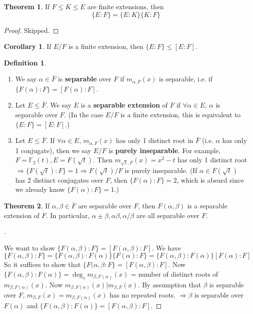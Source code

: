 \documentclass{article}
\theoremstyle{definition}
\newtheorem{thm}{Theorem}
\newtheorem{dfn}{Definition}
\newtheorem{cor}{Corollary}
\newenvironment{proofs}[1][\proofname]{%
  \begin{proof}[#1]$ $\par\nobreak\ignorespaces
}{%
  \end{proof}
}
\begin{document}
\begin{thm}
	If $F \leq K \leq E$ are finite extensions, then
	\[
		\{E:F\} = \{E:K\}\{K:F\}
	\]
\end{thm}

\begin{proof}
	Skipped.
\end{proof}

\begin{cor}
	If $E/F$ is a finite extension, then $\{E:F\} \leq [E:F]$.
\end{cor}

\begin{dfn}
	\begin{enumerate}
		\item[(1)] We say $\alpha \in \bar{F}$ is \textbf{separable} over $F$ if $m_{\alpha, F}(x)$ is separable, i.e. if $\{F(\alpha):F\} = [F(\alpha):F]$.

		\item[(2)] Let $E \leq \bar{F}$.
			We say $E$ is a \textbf{separable extension} of $F$ if $\forall \alpha \in E$, $\alpha$ is separable over $F$.
			(In the case $E/F$ is a finite extension, this is equivalent to $\{E:F\} = [E:F]$.)

		\item[(3)] Let $E \leq \bar{F}$.
			If $\forall \alpha \in E$, $m_{\alpha, F}(x)$ has only 1 distinct root in $\bar{F}$ (i.e. $\alpha$ has only 1 conjugate), then we say $E/F$ is \textbf{purely inseparable}.
			For example, $F = \mathbb{F}_2(t), E = F(\sqrt{t})$.
			Then $m_{\sqrt{t}, F}(x) = x^2 - t$ has only 1 distinct root $\Rightarrow \{F(\sqrt{t}):F\} = 1 \Rightarrow F(\sqrt{t})/F$ is purely inseparable.
			(If $\alpha \in F(\sqrt{t})$ has 2 distinct conjugates over $F$, then $\{F(\alpha):F\} = 2$, which is absurd since we already know $\{F(\alpha):F\} = 1$.)
	\end{enumerate}
\end{dfn}

\begin{thm}
	If $\alpha, \beta \in \bar{F}$ are separable over $F$, then $F(\alpha, \beta)$ is a separable extension of $F$. 
	In particular, $\alpha \pm \beta, \alpha \beta, \alpha/\beta$ are all separable over $F$.
\end{thm}

\begin{proofs}
	We want to show $\{F(\alpha, \beta) :F\} = [F(\alpha, \beta):F]$.
	We have	
	\[
		\{F(\alpha, \beta):F\} = \{ F(\alpha, \beta):F(\alpha)\}\{F(\alpha):F\} = \{ F(\alpha, \beta):F(\alpha)\}[F(\alpha):F]
	\]
	So it suffices to show that $\{F(\alpha, \beta:F\} = [F(\alpha, \beta):F]$.
	Now $\{F(\alpha, \beta) :F(\alpha)\} = \deg_s m_{\beta, F(\alpha)}(x)$ = number of distinct roots of $m_{\beta, F(\alpha)}(x)$.
	Now $m_{\beta, F(\alpha)}(x) | m_{\beta, F}(x)$.
	By assumption that $\beta$ is separable over $F$, $m_{\beta, F}(x) = m_{\beta, F(\alpha)}(x)$ has no repeated roots.
	$\Rightarrow \beta$ is separable over $F(\alpha)$ and $\{F(\alpha, \beta):F(\alpha)\} = [F(\alpha, \beta):F]$.
\end{proofs}
\end{document}
